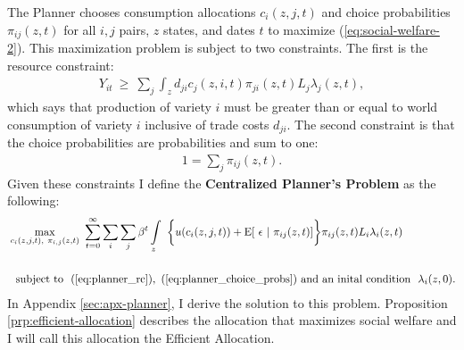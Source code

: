 \documentclass[12pt,pdftex]{article}
\begin{document}
\begin{onehalfspacing}
The Planner chooses consumption allocations $c_{i}(z, j, t)$ and choice probabilities $\pi_{ij}(z,t)$ for all $i,j$ pairs, $z$ states, and dates $t$ to maximize (\ref{eq:social-welfare-2}). This maximization problem is subject to two constraints. The first is the resource constraint:
\begin{align}
Y_{it} \  \geq \ \sum_{j} \int_{z} d_{ji} c_{j}(z, i, t) \pi_{ji}(z,t) L_{j}\lambda_{j}(z, t),
\label{eq:planner_rc}
\end{align}
which says that production of variety $i$ must be greater than or equal to world consumption of variety $i$ inclusive of trade costs $d_{ji}$. The second constraint is that the choice probabilities are probabilities and sum to one:
\begin{align}
1 = \sum_{j}\pi_{ij}(z,t).
\label{eq:planner_choice_probs}
\end{align}
Given these constraints I define the \textbf{Centralized Planner's Problem} as the following:
\begin{align}
&\max\limits_{c_{i}(z, j, t),\ \pi_{i,j}(z, t)} \ \sum_{t=0}^{\infty}  \sum_{i} \sum_{j} \beta^{t} \int\limits_{z}   \  \bigg \{  u(c_{i}(z, j, t) ) + \mathrm{E}[ \ \epsilon \ | \ \pi_{ij}(z,t) ] \bigg \}\pi_{ij}(z,t) L_{i} \lambda_{i}(z, t) \ \ \label{eq:planner_problem}\\
\nonumber \\
& \ \ \mbox{subject to} \ \ (\ref{eq:planner_rc}), \ (\ref{eq:planner_choice_probs}) \ \mbox{and an inital condition} \ \ \lambda_i(z, 0).
\end{align}
In Appendix \ref{sec:apx-planner}, I derive the solution to this problem. Proposition \ref{prp:efficient-allocation} describes the allocation that maximizes social welfare and I will call this allocation the Efficient Allocation.


\end{onehalfspacing}
\end{document}
